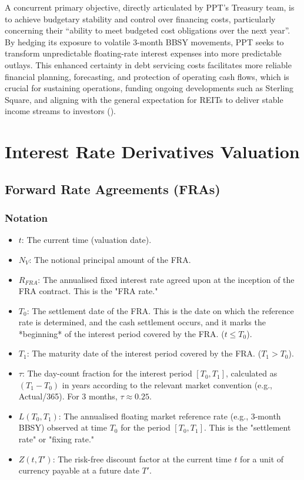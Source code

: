 \documentclass[11pt, a4paper, british]{article}
\begin{document}
A concurrent primary objective, directly articulated by PPT’s Treasury team, is to achieve budgetary stability and control over financing costs, particularly concerning their “ability to meet budgeted cost obligations over the next year”. By hedging its exposure to volatile 3-month BBSY movements, PPT seeks to transform unpredictable floating-rate interest expenses into more predictable outlays. This enhanced certainty in debt servicing costs facilitates more reliable financial planning, forecasting, and protection of operating cash flows, which is crucial for sustaining operations, funding ongoing developments such as Sterling Square, and aligning with the general expectation for REITs to deliver stable income streams to investors (\cite{fss}).
\newpage

\section{Interest Rate Derivatives Valuation}

\subsection{Forward Rate Agreements (FRAs)}

\subsubsection{Notation}
\begin{itemize}
 \item $t$: The current time (valuation date).
 \item $N_V$: The notional principal amount of the FRA.
 \item $R_{FRA}$: The annualised fixed interest rate agreed upon at the inception of the FRA contract. This is the "FRA rate."
 \item $T_0$: The settlement date of the FRA. This is the date on which the reference rate is determined, and the cash settlement occurs, and it marks the *beginning* of the interest period covered by the FRA. ($t \le T_0$).
 \item $T_1$: The maturity date of the interest period covered by the FRA. ($T_1 > T_0$).
 \item $\tau$: The day-count fraction for the interest period $[T_0, T_1]$, calculated as $(T_1 - T_0)$ in years according to the relevant market convention (e.g., Actual/365). For 3 months, $\tau \approx 0.25$.
 \item $L(T_0, T_1)$: The annualised floating market reference rate (e.g., 3-month BBSY) observed at time $T_0$ for the period $[T_0, T_1]$. This is the "settlement rate" or "fixing rate."
 \item $Z(t, T')$: The risk-free discount factor at the current time $t$ for a unit of currency payable at a future date $T'$.
\end{itemize}
\end{document}
